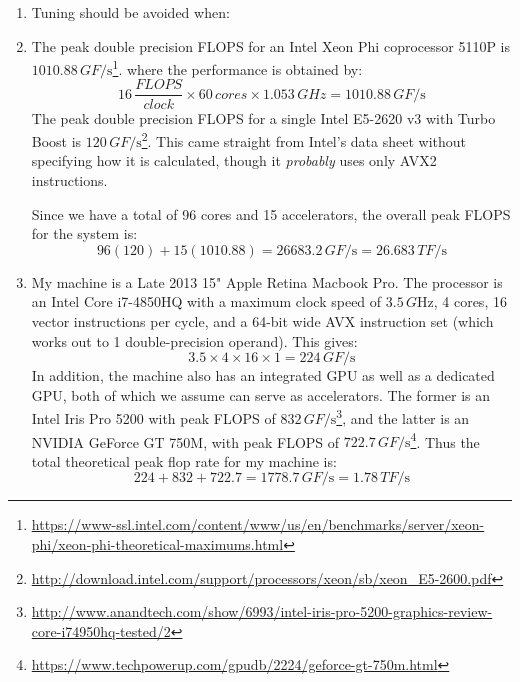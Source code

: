 \documentclass{scrartcl}
\begin{document}
\begin{enumerate}
    \item Tuning should be avoided when:
    \item The peak double precision FLOPS for an Intel Xeon Phi coprocessor 5110P is $1010.88\,\si{GF/\s}$\footnote{\url{https://www-ssl.intel.com/content/www/us/en/benchmarks/server/xeon-phi/xeon-phi-theoretical-maximums.html}}. where the performance is obtained by:
    \[
      16\,\frac{\si{FLOPS}}{\si{clock}} \times 60\,\si{cores} \times 1.053\,\si{GHz} = 1010.88\,\si{GF/\s}
    \]
    The peak double precision FLOPS for a single Intel E5-2620 v3 with Turbo Boost is $120\,\si{GF/\s}$\footnote{\url{http://download.intel.com/support/processors/xeon/sb/xeon_E5-2600.pdf}}. This came straight from Intel's data sheet without specifying how it is calculated, though it \emph{probably} uses only AVX2 instructions.

    Since we have a total of 96 cores and 15 accelerators, the overall peak FLOPS for the system is:
    \[
      96(120) + 15(1010.88) = 26683.2\,\si{GF/\s} = 26.683\,\si{TF/\s}
    \]
    \item My machine is a Late 2013 15" Apple Retina Macbook Pro. The processor is an Intel Core i7-4850HQ with a maximum clock speed of $3.5\,\si{G\Hz}$, 4 cores, 16 vector instructions per cycle, and a 64-bit wide AVX instruction set (which works out to 1 double-precision operand). This gives:
    \[
      3.5 \times 4 \times 16 \times 1 = 224\,\si{GF/\s}
    \]
    In addition, the machine also has an integrated GPU as well as a dedicated GPU, both of which we assume can serve as accelerators. The former is an Intel Iris Pro 5200 with peak FLOPS of $832\,\si{GF/\s}$\footnote{\url{http://www.anandtech.com/show/6993/intel-iris-pro-5200-graphics-review-core-i74950hq-tested/2}}, and the latter is an NVIDIA GeForce GT 750M, with peak FLOPS of $722.7\,\si{GF/\s}$\footnote{\url{https://www.techpowerup.com/gpudb/2224/geforce-gt-750m.html}}. Thus the total theoretical peak flop rate for my machine is:
    \[
      224 + 832 + 722.7 = 1778.7\,\si{GF/\s} = 1.78\,\si{TF/\s}
    \]
  \end{enumerate}
\end{document}

